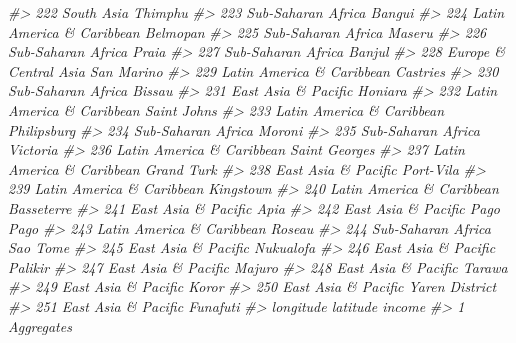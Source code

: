 \documentclass[
  xelatex, ja=standard]{bxjsbook}
\newenvironment{Shaded}{\begin{snugshade}}{\end{snugshade}}
\newcommand{\CommentTok}[1]{\textcolor[rgb]{0.56,0.35,0.01}{\textit{#1}}}
\theoremstyle{definition}
\theoremstyle{definition}
\theoremstyle{definition}
\theoremstyle{definition}
\theoremstyle{remark}
\begin{document}
\begin{Shaded}
\begin{Highlighting}[]
\CommentTok{\#\textgreater{} 222                 South Asia             Thimphu}
\CommentTok{\#\textgreater{} 223         Sub{-}Saharan Africa              Bangui}
\CommentTok{\#\textgreater{} 224  Latin America \& Caribbean            Belmopan}
\CommentTok{\#\textgreater{} 225         Sub{-}Saharan Africa              Maseru}
\CommentTok{\#\textgreater{} 226         Sub{-}Saharan Africa               Praia}
\CommentTok{\#\textgreater{} 227         Sub{-}Saharan Africa              Banjul}
\CommentTok{\#\textgreater{} 228      Europe \& Central Asia          San Marino}
\CommentTok{\#\textgreater{} 229  Latin America \& Caribbean            Castries}
\CommentTok{\#\textgreater{} 230         Sub{-}Saharan Africa              Bissau}
\CommentTok{\#\textgreater{} 231        East Asia \& Pacific             Honiara}
\CommentTok{\#\textgreater{} 232  Latin America \& Caribbean        Saint John\textquotesingle{}s}
\CommentTok{\#\textgreater{} 233  Latin America \& Caribbean         Philipsburg}
\CommentTok{\#\textgreater{} 234         Sub{-}Saharan Africa              Moroni}
\CommentTok{\#\textgreater{} 235         Sub{-}Saharan Africa            Victoria}
\CommentTok{\#\textgreater{} 236  Latin America \& Caribbean      Saint George\textquotesingle{}s}
\CommentTok{\#\textgreater{} 237  Latin America \& Caribbean          Grand Turk}
\CommentTok{\#\textgreater{} 238        East Asia \& Pacific           Port{-}Vila}
\CommentTok{\#\textgreater{} 239  Latin America \& Caribbean           Kingstown}
\CommentTok{\#\textgreater{} 240  Latin America \& Caribbean          Basseterre}
\CommentTok{\#\textgreater{} 241        East Asia \& Pacific                Apia}
\CommentTok{\#\textgreater{} 242        East Asia \& Pacific           Pago Pago}
\CommentTok{\#\textgreater{} 243  Latin America \& Caribbean              Roseau}
\CommentTok{\#\textgreater{} 244         Sub{-}Saharan Africa            Sao Tome}
\CommentTok{\#\textgreater{} 245        East Asia \& Pacific          Nuku\textquotesingle{}alofa}
\CommentTok{\#\textgreater{} 246        East Asia \& Pacific             Palikir}
\CommentTok{\#\textgreater{} 247        East Asia \& Pacific              Majuro}
\CommentTok{\#\textgreater{} 248        East Asia \& Pacific              Tarawa}
\CommentTok{\#\textgreater{} 249        East Asia \& Pacific               Koror}
\CommentTok{\#\textgreater{} 250        East Asia \& Pacific      Yaren District}
\CommentTok{\#\textgreater{} 251        East Asia \& Pacific            Funafuti}
\CommentTok{\#\textgreater{}      longitude   latitude              income}
\CommentTok{\#\textgreater{} 1                                  Aggregates}

\end{Highlighting}
\end{Shaded}
\end{document}
